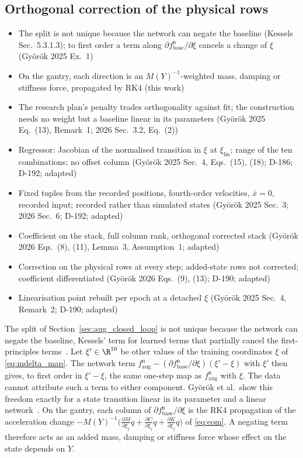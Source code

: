 \subsection{Orthogonal correction of the physical rows}\label{sec:obc_map}
\ifdraft
\begin{itemize}
\item The split is not unique because the network can negate the baseline (Kessels Sec.~5.3.1.3); to first order a term along $\partial f^{\mathrm n}_{\mathrm{base}}/\partial\xi$ cancels a change of $\xi$ (Gy\"or\"ok 2025 Ex.~1)
\item On the gantry, each direction is an $M(Y)^{-1}$-weighted mass, damping or stiffness force, propagated by RK4 (this work)
\item The research plan's penalty trades orthogonality against fit; the construction needs no weight but a baseline linear in its parameters (Gy\"or\"ok 2025 Eq.~(13), Remark~1; 2026 Sec.~3.2, Eq.~(2))
\item Regressor: Jacobian of the normalised transition in $\xi$ at $\xi_{\mathrm{lin}}$; range of the ten combinations; no offset column (Gy\"or\"ok 2025 Sec.~4, Eqs.~(15), (18); D-186; D-192; adapted)
\item Fixed tuples from the recorded positions, fourth-order velocities, $\bar x=0$, recorded input; recorded rather than simulated states (Gy\"or\"ok 2025 Sec.~3; 2026 Sec.~6; D-192; adapted)
\item Coefficient on the stack, full column rank, orthogonal corrected stack (Gy\"or\"ok 2026 Eqs.~(8), (11), Lemma~3, Assumption~1; adapted)
\item Correction on the physical rows at every step; added-state rows not corrected; coefficient differentiated (Gy\"or\"ok 2026 Eqs.~(9), (13); D-190; adapted)
\item Linearisation point rebuilt per epoch at a detached $\xi$ (Gy\"or\"ok 2025 Sec.~4, Remark~2; D-190; adapted)
\end{itemize}
\fi

The split of Section~\ref{sec:aug_closed_loop} is not unique because the
network can negate the baseline, Kessels' term for learned terms that
partially cancel the first-principles terms~\cite[Sec.~5.3.1.3]{kessels2025ai}.
Let $\xi'\in\R^{10}$ be other values of the training coordinates $\xi$ of
\eqref{eq:mdelta_map}.
The network term
$f^{\mathrm n}_{\mathrm{aug}}-(\partial f^{\mathrm n}_{\mathrm{base}}/\partial\xi)(\xi'-\xi)$
with $\xi'$ then gives, to first order in $\xi'-\xi$, the same one-step map as
$f^{\mathrm n}_{\mathrm{aug}}$ with $\xi$.
The data cannot attribute such a term to either component.
Gy\"or\"ok et al.\ show this freedom exactly for a state transition linear in
its parameter and a linear network~\cite[Ex.~1]{gyorok2025l4dc}.
On the gantry, each column of $\partial f^{\mathrm n}_{\mathrm{base}}/\partial\xi$
is the RK4 propagation of the acceleration change
$-M(Y)^{-1}\bigl(\tfrac{\partial M}{\partial\xi_j}\ddot q+\tfrac{\partial C}{\partial\xi_j}\dot q+\tfrac{\partial K}{\partial\xi_j}q\bigr)$
of \eqref{eq:eom}.
A negating term therefore acts as an added mass, damping or stiffness force
whose effect on the state depends on $Y$.

